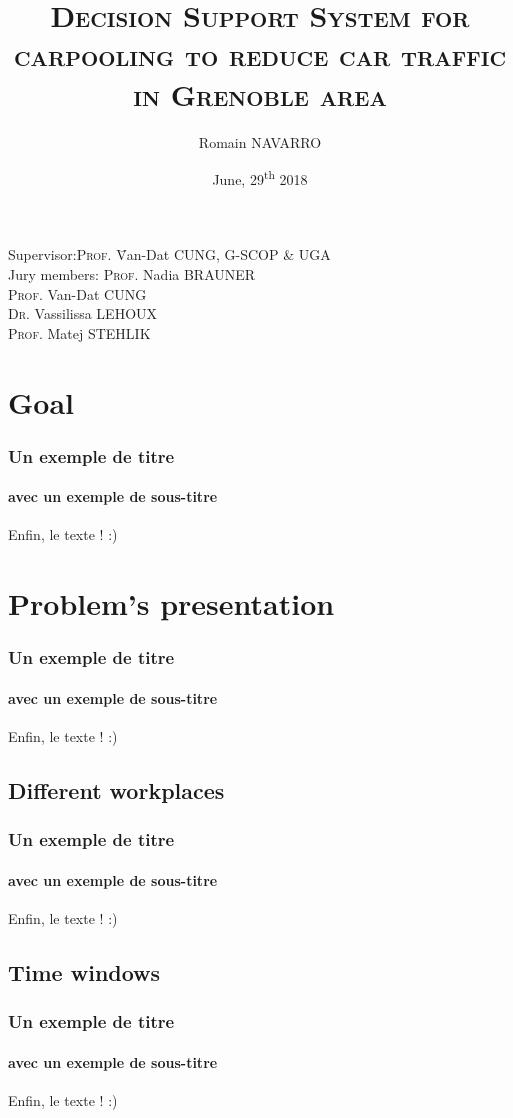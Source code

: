 \documentclass{beamer}
\title[Reducing Grenoble's car traffic]{\textsc{Decision Support System for carpooling to reduce car traffic in Grenoble area}}
\author{Romain NAVARRO}
\institute{ORCO \\ UGA \& ENSIMAG}
\date{June, 29\textsuperscript{th} 2018}
\newcommand\tab[1][1cm]{\hspace*{#1}}
\begin{document}
	\begin{frame}
		\maketitle
		\begin{tabbing}
			Supervisor:\tab \= \textsc{Prof.} \=Van-Dat \textsc{CUNG}, G-SCOP \& UGA\\\medskip
			Jury members: \> \textsc{Prof.} \>Nadia \textsc{BRAUNER}\\
			\> \textsc{Prof.} \>Van-Dat \textsc{CUNG}\\
			\> \textsc{Dr.} \>Vassilissa \textsc{LEHOUX}\\
			\> \textsc{Prof.} \>Matej \textsc{STEHLIK}
		\end{tabbing}
	\end{frame}
	
	\begin{frame}
		\tableofcontents[hideallsubsections]
	\end{frame}
	\section{Goal}
	\begin{frame}[label=pagebanale]
		\frametitle{Un exemple de titre}
		\framesubtitle{avec un exemple de sous-titre}
		Enfin, le texte ! :)
	\end{frame}
	\section{Problem's presentation}
	\begin{frame}
		\frametitle{Un exemple de titre}
		\framesubtitle{avec un exemple de sous-titre}
		Enfin, le texte ! :)
	\end{frame}
	\subsection{Different workplaces}
	\begin{frame}
		\frametitle{Un exemple de titre}
		\framesubtitle{avec un exemple de sous-titre}
		Enfin, le texte ! :)
	\end{frame}
	\subsection{Time windows}
	\begin{frame}
		\frametitle{Un exemple de titre}
		\framesubtitle{avec un exemple de sous-titre}
		Enfin, le texte ! :)
	\end{frame}
\end{document}
